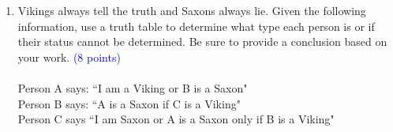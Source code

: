 \documentclass{article}
\newcommand{\pt}[1]{\textcolor{blue}{(#1 points)}}
\begin{document}
\begin{enumerate}
    \item Vikings always tell the truth and Saxons always lie.  Given the following information, use a truth table to determine what type each person is or if their status cannot be determined.  Be sure to provide a conclusion based on your work. \pt{8}
    \\
    \\
    Person A says: ``I am a Viking or B is a Saxon"\\
    Person B says: ``A is a Saxon if C is a Viking"\\
    Person C says ``I am Saxon or A is a Saxon only if B is a Viking"
    
    
\end{enumerate}
\end{document}
